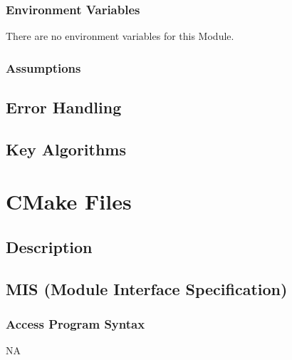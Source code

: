 \documentclass[12pt]{article}
\begin{document}
\subsubsection{Environment Variables}%
There are no environment variables for this Module.

\subsubsection{Assumptions}%

\subsection{Error Handling}

\subsection{Key Algorithms}

\section{CMake Files}
\subsection{Description}
\subsection{MIS (Module Interface Specification)}
\subsubsection{Access Program Syntax}%
NA
\end{document}
